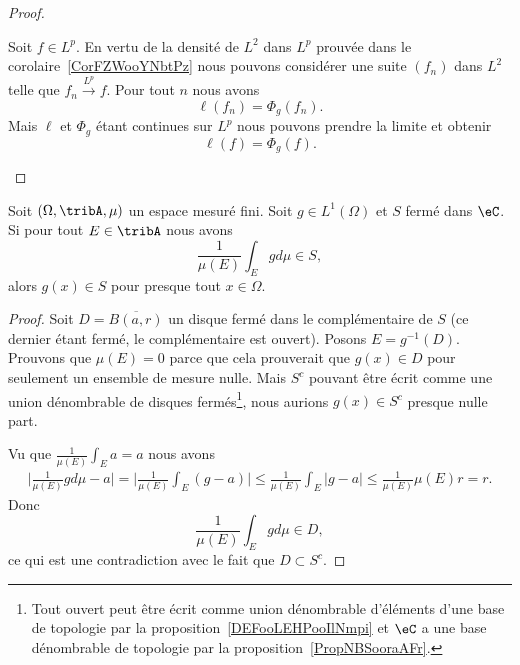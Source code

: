 \begin{proof}
\begin{subproof}
\begin{subproof}
        \spitem[\( \ell(f)=\Phi_g(f)\)]

        Soit \( f\in L^p\). En vertu de la densité de \( L^2\) dans \( L^p\) prouvée dans le corolaire~\ref{CorFZWooYNbtPz} nous pouvons considérer une suite \( (f_n)\) dans \( L^2\) telle que \( f_n\stackrel{L^p}{\longrightarrow}f\). Pour tout \( n\) nous avons
        \begin{equation}
            \ell(f_n)=\Phi_g(f_n).
        \end{equation}
        Mais \( \ell\) et \( \Phi_g\) étant continues sur \( L^p\) nous pouvons prendre la limite et obtenir
        \begin{equation}
            \ell(f)=\Phi_g(f).
        \end{equation}
    \end{subproof}
\end{subproof}
\end{proof}

\begin{lemma} \label{LemHNPEooHtMOGY}
Soit \( (\Omega,\tribA,\mu)\) un espace mesuré fini. Soit \( g\in L^1(\Omega)\) et \( S\) fermé dans \( \eC\). Si pour tout \( E\in \tribA\) nous avons
\begin{equation}
    \frac{1}{ \mu(E) }\int_Egd\mu\in S,
\end{equation}
alors \( g(x)\in S\) pour presque tout \( x\in \Omega\).
\end{lemma}

\begin{proof}
Soit \( D=\overline{ B(a,r) }\) un disque fermé dans le complémentaire de \( S\) (ce dernier étant fermé, le complémentaire est ouvert). Posons \( E=g^{-1}(D)\). Prouvons que \( \mu(E)=0\) parce que cela prouverait que \( g(x)\in D\) pour seulement un ensemble de mesure nulle. Mais \( S^c\) pouvant être écrit comme une union dénombrable de disques fermés\footnote{Tout ouvert peut être écrit comme union dénombrable d'éléments d'une base de topologie par la proposition~\ref{DEFooLEHPooIlNmpi} et \( \eC\) a une base dénombrable de topologie par la proposition~\ref{PropNBSooraAFr}.}, nous aurions \( g(x)\in S^c\) presque nulle part.

Vu que \( \frac{1}{ \mu(E) }\int_Ea=a\) nous avons
\begin{subequations}
    \begin{align}
        \big| \frac{1}{ \mu(E) }gd\mu-a \big|=\big| \frac{1}{ \mu(E) }\int_E(g-a) \big|\leq  \frac{1}{ \mu(E) }\int_E| g-a |\leq\frac{1}{ \mu(E) }\mu(E)r=r.
    \end{align}
\end{subequations}
Donc
\begin{equation}
    \frac{1}{ \mu(E) }\int_Egd\mu\in D,
\end{equation}
ce qui est une contradiction avec le fait que \( D\subset S^c\).
\end{proof}

